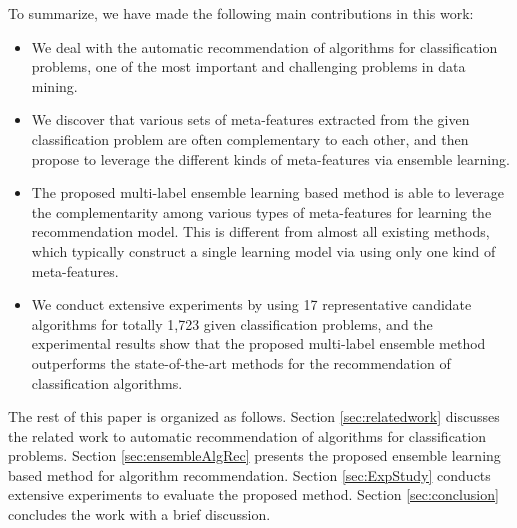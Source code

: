 \documentclass[prodmode,acmtkdd]{acmsmall}
\begin{document}








To summarize, we have made the following main contributions in this work:
\begin{itemize}
\item We deal with the automatic recommendation of algorithms for classification problems,
one of the most important and challenging problems in data mining.
\item We discover that various sets of meta-features extracted from the given classification problem are often complementary to each other,
and then propose to leverage the different kinds of meta-features via ensemble learning.
\item The proposed multi-label ensemble learning based method is able to leverage the complementarity among various types of meta-features for learning the recommendation model.
This is different from almost all existing methods, which typically construct a single learning model via using only one kind of meta-features.	
\item We conduct extensive experiments by using 17 representative candidate algorithms for totally 1,723 given classification problems,
and the experimental results show that the proposed multi-label ensemble method outperforms the state-of-the-art methods for the recommendation of classification algorithms.
\end{itemize}


The rest of this paper is organized as follows.
Section \ref{sec:relatedwork} discusses the related work to automatic recommendation of algorithms for classification problems.
Section \ref{sec:ensembleAlgRec} presents the proposed ensemble learning based method for algorithm recommendation.
Section \ref{sec:ExpStudy} conducts extensive experiments to evaluate the proposed method.
Section \ref{sec:conclusion} concludes the work with a brief discussion.
\end{document}
